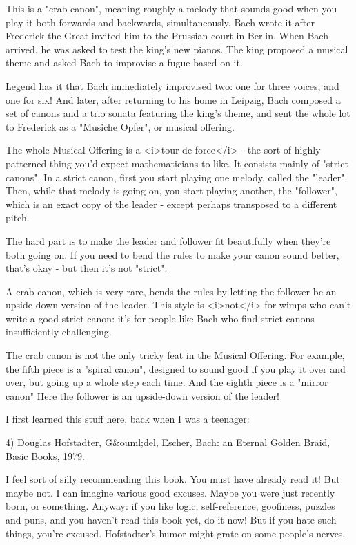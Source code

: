 This is a "crab canon", meaning roughly a melody that sounds
good when you play it both forwards and backwards, simultaneously.
Bach wrote it after Frederick the Great invited him to the Prussian
court in Berlin.  When Bach arrived, he was asked to test the king's
new pianos.  The king proposed a musical theme and asked Bach to
improvise a fugue based on it.

Legend has it that Bach immediately improvised two: one for three 
voices, and one for six!  And later, after returning to his home in 
Leipzig, Bach composed a set of canons and a trio sonata featuring 
the king's theme, and sent the whole lot to Frederick as 
a "Musiche Opfer", or musical offering.

The whole Musical Offering is a <i>tour de force</i> - the sort of
highly patterned thing you'd expect mathematicians to like.  It
consists mainly of "strict canons".  In a strict canon,
first you start playing one melody, called the "leader".
Then, while that melody is going on, you start playing another, the
"follower", which is an exact copy of the leader - except
perhaps transposed to a different pitch.

The hard part is to make the leader and follower fit beautifully when
they're both going on.  If you need to bend the rules to make your
canon sound better, that's okay - but then it's not
"strict".

A crab canon, which is very rare, bends the rules by letting the
follower be an upside-down version of the leader.  This style is
<i>not</i> for wimps who can't write a good strict canon: it's for
people like Bach who find strict canons insufficiently challenging.  

The crab canon is not the only tricky feat in the Musical Offering.
For example, the fifth piece is a "spiral canon", designed
to sound good if you play it over and over, but going up a whole step
each time.  And the eighth piece is a "mirror canon" Here
the follower is an upside-down version of the leader!

I first learned this stuff here, back when I was a teenager:

4) Douglas Hofstadter, G&ouml;del, Escher, Bach: an Eternal Golden Braid,
Basic Books, 1979.

I feel sort of silly recommending this book.  You must have already
read it!  But maybe not.  I can imagine various good excuses.  Maybe
you were just recently born, or something.  Anyway: if you like logic,
self-reference, goofiness, puzzles and puns, and you haven't read this
book yet, do it now!  But if you hate such things, you're excused.
Hofstadter's humor might grate on some people's nerves.

